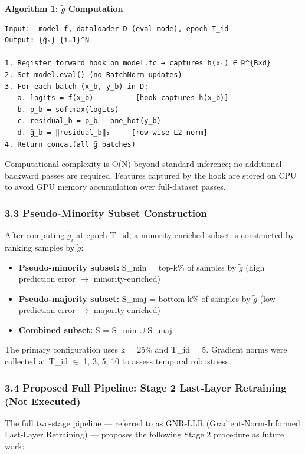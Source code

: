 \textbf{Algorithm 1: $\tilde{g}$ Computation}

\begin{verbatim}
Input:  model f, dataloader D (eval mode), epoch T_id
Output: {g̃ᵢ}_{i=1}^N

1. Register forward hook on model.fc → captures h(xᵢ) ∈ ℝ^{B×d}
2. Set model.eval() (no BatchNorm updates)
3. For each batch (x_b, y_b) in D:
   a. logits = f(x_b)          [hook captures h(x_b)]
   b. p_b = softmax(logits)
   c. residual_b = p_b − one_hot(y_b)
   d. g̃_b = ‖residual_b‖₂     [row-wise L2 norm]
4. Return concat(all g̃ batches)
\end{verbatim}

Computational complexity is O(N) beyond standard inference; no additional backward passes are required. Features captured by the hook are stored on CPU to avoid GPU memory accumulation over full-dataset passes.

\subsubsection{3.3 Pseudo-Minority Subset Construction}

After computing ${\tilde{g}_{i}}$ at epoch T\_id, a minority-enriched subset is constructed by ranking samples by $\tilde{g}$:

\begin{itemize}
\item \textbf{Pseudo-minority subset:} S\_min = top-k\% of samples by $\tilde{g}$ (high prediction error $\rightarrow$ minority-enriched)
\item \textbf{Pseudo-majority subset:} S\_maj = bottom-k\% of samples by $\tilde{g}$ (low prediction error $\rightarrow$ majority-enriched)
\item \textbf{Combined subset:} S = S\_min $\cup$ S\_maj
\end{itemize}

The primary configuration uses k = 25\% and T\_id = 5. Gradient norms were collected at T\_id $\in$ {1, 3, 5, 10} to assess temporal robustness.

\subsubsection{3.4 Proposed Full Pipeline: Stage 2 Last-Layer Retraining (Not Executed)}

The full two-stage pipeline --- referred to as GNR-LLR (Gradient-Norm-Informed Last-Layer Retraining) --- proposes the following Stage 2 procedure as future work:

